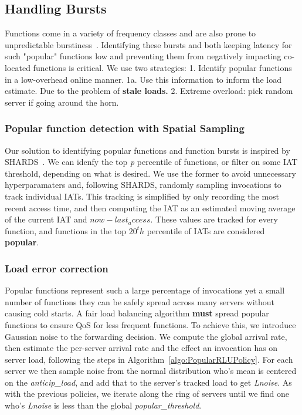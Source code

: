 \subsection{Handling Bursts}

Functions come in a variety of frequency classes and are also prone to unpredictable burstiness~\cite{TODO}.
Identifying these bursts and both keeping latency for such "popular" functions low and preventing them from negatively impacting co-located functions is critical.
We use two strategies:
1. Identify popular functions in a low-overhead online manner.
1a. Use this information to inform the load estimate. Due to the problem of \textbf{stale loads.}
2. Extreme overload: pick random server if going around the horn. 

\subsubsection{Popular function detection with Spatial Sampling}

Our solution to identifying popular functions and function bursts is inspired by SHARDS~\cite{shards}.
We can idenfy the top \textit{p} percentile of functions, or filter on some IAT threshold, depending on what is desired. 
We use the former to avoid unnecessary hyperparamaters and, following SHARDS, randomly sampling invocations to track individual IATs.
This tracking is simplified by only recording the most recent access time, and then computing the IAT as an estimated moving average of the current IAT and  $now - last_access$.
These values are tracked for every function, and functions in the top $20^th$ percentile of IATs are considered \textbf{popular}.

\subsubsection{Load error correction}

Popular functions represent such a large percentage of invocations yet a small number of functions they can be safely spread across many servers without causing cold starts.
A fair load balancing algorithm \textbf{must} spread popular functions to ensure QoS for less frequent functions.
To achieve this, we introduce Gaussian noise to the forwarding decision.
We compute the global arrival rate, then estimate the per-server arrival rate and the effect an invocation has on server load, following the steps in Algorithm~\ref{algo:PopularRLUPolicy}.
For each server we then sample noise from the normal distribution who's mean is centered on the \textit{anticip\_load}, and add that to the server's tracked load to get \textit{Lnoise}.
As with the previous policies, we iterate along the ring of servers until we find one who's \textit{Lnoise} is less than the global \textit{popular\_threshold}.

